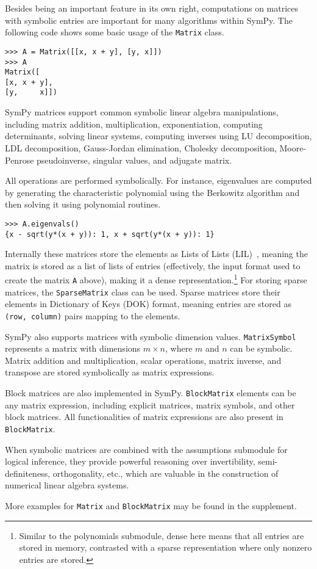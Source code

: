Besides being an important feature in its own right, computations on
matrices with symbolic entries are important for many algorithms
within SymPy.  The following code shows some basic usage of the
\texttt{Matrix} class.
\begin{verbatim}
>>> A = Matrix([[x, x + y], [y, x]])
>>> A
Matrix([
[x, x + y],
[y,     x]])
\end{verbatim}

SymPy matrices support common symbolic linear algebra manipulations, including
matrix addition, multiplication, exponentiation, computing determinants,
solving linear systems, computing inverses using LU decomposition, LDL
decomposition, Gauss-Jordan elimination, Cholesky decomposition, Moore-Penrose
pseudoinverse, singular values, and adjugate matrix.

All operations are performed symbolically. For instance, eigenvalues are computed
by generating the characteristic polynomial using the Berkowitz algorithm and
then solving it using polynomial routines.

\begin{verbatim}
>>> A.eigenvals()
{x - sqrt(y*(x + y)): 1, x + sqrt(y*(x + y)): 1}
\end{verbatim}

Internally these matrices store the elements as Lists of Lists (LIL)~\cite{scipy}, meaning
the matrix is stored as a list of lists of entries (effectively, the
input format used to create the matrix \texttt{A} above), making it a
dense representation.\footnote{Similar to the polynomials submodule, dense here
  means that all entries are stored in memory, contrasted with a sparse
  representation where only nonzero entries are stored.} For storing sparse
matrices, the \verb|SparseMatrix| class can be used. Sparse matrices store
their elements in Dictionary of Keys (DOK) format, meaning entries are stored
as \texttt{(row, column)} pairs mapping to the elements.

SymPy also supports matrices with symbolic dimension values. \verb|MatrixSymbol|
represents a matrix with dimensions $m\times n$, where $m$ and $n$ can be
symbolic. Matrix addition and multiplication, scalar operations, matrix inverse,
and transpose are stored symbolically as matrix expressions.

Block matrices are also implemented in SymPy. \verb|BlockMatrix| elements can
be any matrix expression, including explicit matrices, matrix symbols, and
other block matrices. All functionalities of matrix expressions are also
present in \verb|BlockMatrix|.

When symbolic matrices are combined with the assumptions submodule for logical
inference, they provide powerful reasoning over invertibility,
semi-definiteness, orthogonality, etc., which are valuable in the construction
of numerical linear algebra systems.

More examples for \verb|Matrix| and \verb|BlockMatrix| may be found in the
supplement.
